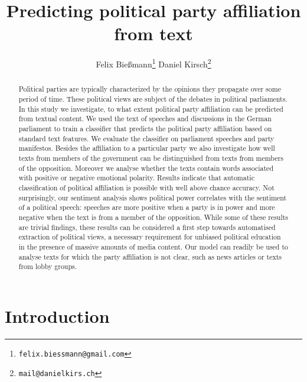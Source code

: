 \documentclass{article} %
\title{Predicting political party affiliation from text}
\author{
Felix Bie\ss{}mann\thanks{\texttt{felix.biessmann@gmail.com}}
\And
Daniel Kirsch\thanks{\texttt{mail@danielkirs.ch}}
}
\begin{document}
\maketitle

\begin{abstract}
Political parties are typically characterized by the opinions they propagate over some period of time. These political views are subject of the debates in political parliaments. In this study we investigate, to what extent political party affiliation can be predicted from textual content. We used the text of speeches and discussions in the German parliament to train a classifier that predicts the political party affiliation based on standard text features. We evaluate the classifier on parliament speeches and party manifestos. Besides the affiliation to a particular party we also investigate how well texts from members of the government can be distinguished from texts from members of the opposition. Moreover we analyse whether the texts contain words associated with positive or negative emotional polarity. Results indicate that automatic classification of political affiliation is possible with well above chance accuracy. Not surprisingly, our sentiment analysis shows political power correlates with the sentiment of a political speech: speeches are more positive when a party is in power and more negative when the text is from a member of the opposition. While some of these results are trivial findings, these results can be considered a first step towards automatised extraction of political views, a necessary requirement for unbiased political education in the presence of massive amounts of media content. Our model can readily be used to analyse texts for which the party affiliation is not clear, such as news articles or texts from lobby groups. 
\end{abstract}

\section{Introduction}
\end{document}
